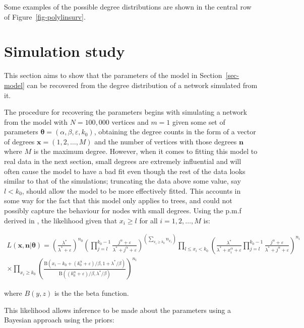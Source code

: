 \documentclass[
  sn-basic,
]{sn-jnl}
\theoremstyle{plain}
\theoremstyle{remark}
\begin{document}
Some examples of the possible degree distributions are shown in the
central row of Figure~\ref{fig-polylinsurv}.

\section{Simulation study}\label{sec-rec}

This section aims to show that the parameters of the model in
Section~\ref{sec-model} can be recovered from the degree distribution of
a network simulated from it.

The procedure for recovering the parameters begins with simulating a
network from the model with \(N=100,000\) vertices and \(m=1\) given
some set of parameters
\(\pmb\theta = (\alpha, \beta, \varepsilon, k_0)\), obtaining the degree
counts in the form of a vector of degrees \(\pmb x = (1,2,\ldots,M)\)
and the number of vertices with those degrees \(\pmb n\) where \(M\) is
the maximum degree. However, when it comes to fitting this model to real
data in the next section, small degrees are extremely influential and
will often cause the model to have a bad fit even though the rest of the
data looks similar to that of the simulations; truncating the data above
some value, say \(l<k_0\), should allow the model to be more effectively
fitted. This accounts in some way for the fact that this model only
applies to trees, and could not possibly capture the behaviour for nodes
with small degrees. Using the p.m.f derived in \citep{rudas07}, the
likelihood given that \(x_i \ge l\) for all \(i =1,2,\ldots,M\) is:

\begin{align*}
L(\pmb x,\pmb n | \pmb \theta) = \left(\frac{\lambda^*}{\lambda^*+\varepsilon}\right)^{n_0}\left(\prod_{j=l}^{k_0-1}\frac{j^\alpha +\varepsilon}{\lambda^* + j^\alpha +\varepsilon}\right)^{\left(\sum_{x_i\ge k_0}n_{x_i}\right)} \prod_{l \le x_i<k_0}\left(\frac{\lambda^*}{\lambda^* +x_i^\alpha + \varepsilon } \prod_{j=l}^{k_0-1}\frac{j^\alpha + \varepsilon}{\lambda^* + j^\alpha + \varepsilon}\right)^{n_i}\\ \times \prod_{x_i\ge k_0}\left(\frac{\text{B}(x_i-k_0 + (k_0^\alpha + \varepsilon)/\beta,1+\lambda^*/\beta)}{\text{B}((k_0^\alpha + \varepsilon)/\beta,\lambda^*/\beta)}\right)^{n_i}
\end{align*}

where \(B(y,z)\) is the the beta function.

This likelihood allows inference to be made about the parameters using a
Bayesian approach using the priors:
\end{document}
